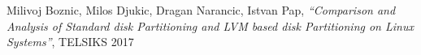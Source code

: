 \begin{thebibliography}{99}

    Milivoj Boznic, Milos Djukic, Dragan Narancic, Istvan Pap,
    \textit{``Comparison and Analysis of Standard disk Partitioning and LVM
    based disk Partitioning on Linux Systems''}, TELSIKS 2017

\end{thebibliography}

